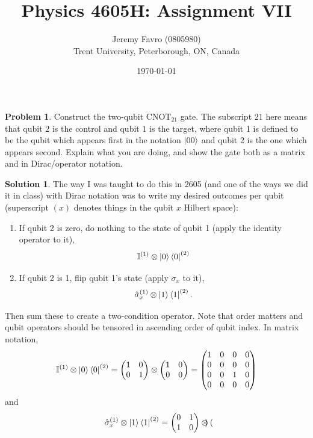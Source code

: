\documentclass[10pt]{article}
\title{Physics 4605H: Assignment VII}
\author{Jeremy Favro (0805980) \\ Trent University, Peterborough, ON, Canada}
\date{\today}
\theoremstyle{definition}
\newtheorem{problem}{Problem}
\newtheorem{soln}{Solution}
\begin{document}
\maketitle

\begin{problem}
Construct the two-qubit $\text{CNOT}_{21}$ gate.
The subscript $21$ here means that qubit $2$ is the control and qubit $1$ is the target, where
qubit 1 is defined to be the qubit which appears first in the notation $\ket{00}$ and qubit 2 is the
one which appears second.
Explain what you are doing, and show the gate both as a matrix and in Dirac/operator
notation.
\end{problem}
\begin{soln}
  The way I was taught to do this in 2605 (and one of the ways we did it in class) with Dirac notation was to write my desired
  outcomes per qubit (superscript $(x)$ denotes things in the qubit $x$ Hilbert space):
  \begin{enumerate}[label=(\roman*)]
    \item If qubit 2 is zero, do nothing to the state of qubit 1 (apply the identity operator to it),
          $$\mathbb{I}^{(1)}\otimes \ket{0}\bra{0}^{(2)}$$
    \item If qubit 2 is 1, flip qubit 1's state (apply $\sigma_x$ to it),
          $$\hat{\sigma}_x^{(1)}\otimes \ket{1}\bra{1}^{(2)}.$$
  \end{enumerate}
  Then sum these to create a two-condition operator. Note that order matters and qubit operators should be tensored
  in ascending order of qubit index.
  In matrix notation,
  $$\mathbb{I}^{(1)}\otimes \ket{0}\bra{0}^{(2)}=\begin{pmatrix}
      1 & 0 \\
      0 & 1
    \end{pmatrix}\otimes
    \begin{pmatrix}
      1 & 0 \\
      0 & 0
    \end{pmatrix}
    =\begin{pmatrix}
      1 & 0 & 0 & 0 \\
      0 & 0 & 0 & 0 \\
      0 & 0 & 1 & 0 \\
      0 & 0 & 0 & 0
    \end{pmatrix}
  $$
  and
  $$\hat{\sigma}_x^{(1)}\otimes \ket{1}\bra{1}^{(2)}=\begin{pmatrix}
      0 & 1 \\
      1 & 0
    \end{pmatrix}\otimes \begin{pmatrix}

\end{pmatrix}$$
\end{soln}
\end{document}
